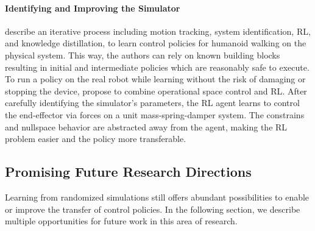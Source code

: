 \documentclass[utf8]{frontiersSCNS} %
\begin{document}
%

\paragraph*{Identifying and Improving the Simulator}
\citet{Xie_VanDePanne_19} describe an iterative process including motion tracking, system identification, \ac{RL}, and knowledge distillation, to learn control policies for humanoid walking on the physical system.
This way, the authors can rely on known building blocks resulting in initial and intermediate policies which are reasonably safe to execute.
%
To run a policy on the real robot while learning without the risk of damaging or stopping the device, \citet{Kaspar_Bock_20} propose to combine operational space control and \ac{RL}.
After carefully identifying the simulator's parameters, the \ac{RL} agent learns to control the end-effector via forces on a unit mass-spring-damper system.
The constrains and nullspace behavior are abstracted away from the agent, making the \ac{RL} problem easier and the policy more transferable.
%


\subsection{Promising Future Research Directions}
\label{sec_sota_future_research}
Learning from randomized simulations still offers abundant possibilities to enable or improve the \simtoreal transfer of control policies.
In the following section, we describe multiple opportunities for future work in this area of research.

\end{document}

